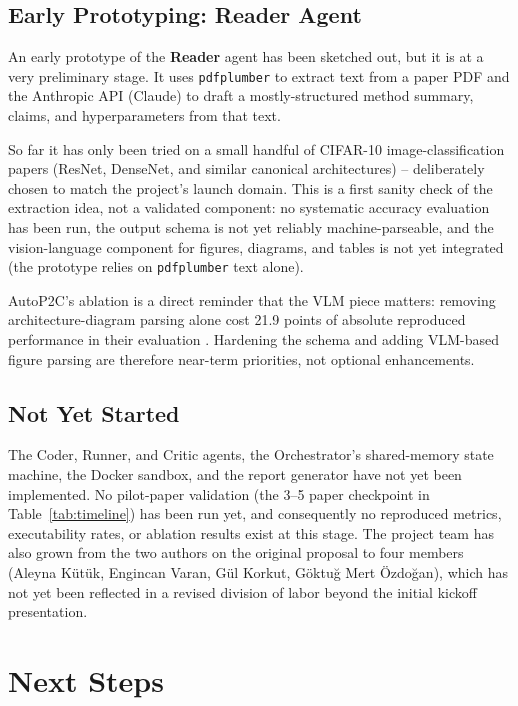 \documentclass[10pt,twocolumn]{article}
\begin{document}
\subsection{Early Prototyping: Reader Agent}

An early prototype of the \textbf{Reader} agent has been sketched out, but it is at a
very preliminary stage. It uses \texttt{pdfplumber} to extract text from a paper PDF and
the Anthropic API (Claude) to draft a mostly-structured method summary, claims, and
hyperparameters from that text.

So far it has only been tried on a small handful of CIFAR-10 image-classification papers
(ResNet, DenseNet, and similar canonical architectures) -- deliberately chosen to match
the project's launch domain. This is a first sanity check of the extraction idea, not a
validated component: no systematic accuracy evaluation has been run, the output schema is
not yet reliably machine-parseable, and the vision-language component for figures,
diagrams, and tables is not yet integrated (the prototype relies on \texttt{pdfplumber}
text alone).

AutoP2C's ablation is a direct reminder that the VLM piece matters: removing
architecture-diagram parsing alone cost 21.9 points of absolute reproduced performance in
their evaluation \cite{lin2025autop2c}. Hardening the schema and adding VLM-based figure
parsing are therefore near-term priorities, not optional enhancements.

\subsection{Not Yet Started}

The Coder, Runner, and Critic agents, the Orchestrator's shared-memory state machine, the
Docker sandbox, and the report generator have not yet been implemented. No pilot-paper
validation (the 3--5 paper checkpoint in Table~\ref{tab:timeline}) has been run yet, and
consequently no reproduced metrics, executability rates, or ablation results exist at
this stage. The project team has also grown from the two authors on the original
proposal to four members (Aleyna Kütük, Engincan Varan, Gül Korkut, Göktuğ Mert
Özdoğan), which has not yet been reflected in a revised division of labor beyond the
initial kickoff presentation.

\section{Next Steps}
\label{sec:next}
\end{document}
